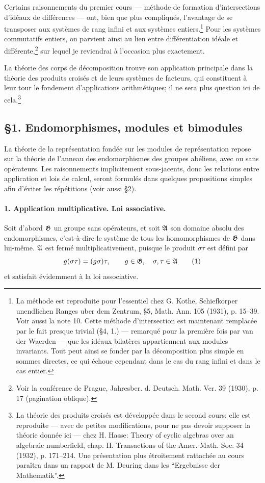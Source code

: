 Certains raisonnements du premier cours --- méthode de formation d'intersections d'idéaux de différences --- ont, bien que plus compliqués, l'avantage de se transposer aux systèmes de rang infini et aux systèmes entiers.\footnote{La méthode est reproduite pour l'essentiel chez G. Kothe, Schiefkorper unendlichen Ranges uber dem Zentrum, \S 5, Math. Ann. 105 (1931), p. 15--39. Voir aussi la note 10. Cette méthode d'intersection est maintenant remplacée par le fait presque trivial (\S 4, 1.) --- remarqué pour la première fois par van der Waerden --- que les idéaux bilatères appartiennent aux modules invariants. Tout peut ainsi se fonder par la décomposition plus simple en sommes directes, ce qui échoue cependant dans le cas du rang infini et dans le cas entier.} Pour les systèmes commutatifs entiers, on parvient ainsi au lien entre différentiation idéale et différente,\footnote{Voir la conférence de Prague, Jahresber. d. Deutsch. Math. Ver. 39 (1930), p. 17 (pagination oblique).} sur lequel je reviendrai à l'occasion plus exactement.

La théorie des corps de décomposition trouve son application principale dans la théorie des produits croisés et de leurs systèmes de facteurs, qui constituent à leur tour le fondement d'applications arithmétiques; il ne sera plus question ici de cela.\footnote{La théorie des produits croisés est développée dans le second cours; elle est reproduite --- avec de petites modifications, pour ne pas devoir supposer la théorie donnée ici --- chez H. Hasse: Theory of cyclic algebras over an algebraic numberfield, chap. II. Transactions of the Amer. Math. Soc. 34 (1932), p. 171--214. Une présentation plus étroitement rattachée au cours paraîtra dans un rapport de M. Deuring dans les ``Ergebnisse der Mathematik''.}

\subsection*{\S 1. Endomorphismes, modules et bimodules}

La théorie de la représentation fondée sur les modules de représentation repose sur la théorie de l'anneau des endomorphismes des groupes abéliens, avec ou sans opérateurs. Les raisonnements implicitement sous-jacents, donc les relations entre application et lois de calcul, seront formulés dans quelques propositions simples afin d'éviter les répétitions (voir aussi \S 2).

\paragraph{1. Application multiplicative. Loi associative.}
Soit d'abord \(\mathfrak G\) un groupe sans opérateurs, et soit \(\mathfrak A\) son domaine absolu des endomorphismes, c'est-à-dire le système de tous les homomorphismes de \(\mathfrak G\) dans lui-même. \(\mathfrak A\) est fermé multiplicativement, puisque le produit \( \sigma\tau \) est défini par
\[
        g(\sigma\tau)=(g\sigma)\tau,
        \qquad g\in\mathfrak G,\quad \sigma,\tau\in\mathfrak A                         \tag{1}
\]
et satisfait évidemment à la loi associative.

